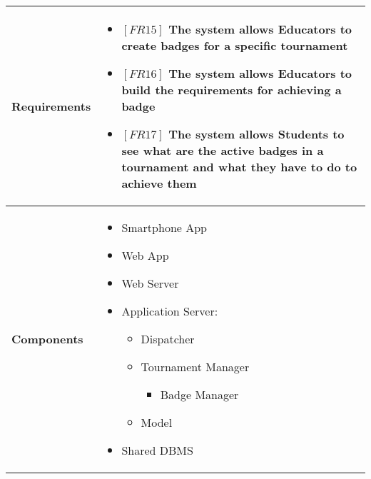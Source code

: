 \documentclass{article}
\begin{document}
\begin{table}[H]
 \renewcommand{\arraystretch}{1.5}
    \centering
    \begin{tabular}{|l|p{10cm}|}
        \hline
        \textbf{Requirements} &
        \vspace{-0.6cm}
        \begin{itemize}[label={}, left=0pt, align=left, itemsep=5pt]
            \item $[FR15]$ The system allows Educators to create badges for a specific tournament
            \item $[FR16]$ The system allows Educators to build the requirements for achieving a badge
            \item $[FR17]$ The system allows Students to see what are the active badges in a tournament and what they have to do to achieve them
        \end{itemize} \\
        \hline
        \textbf{Components} & 
        \begin{itemize}[align=left, topsep=0pt, partopsep=0pt]
            \item Smartphone App
            \item Web App
            \item Web Server
            \item Application Server:
            \begin{itemize}
                \item Dispatcher
                \item Tournament Manager
                \begin{itemize}
                    \item Badge Manager
                \end{itemize}
                \item Model
            \end{itemize}
            \item Shared DBMS 
        \end{itemize} \\
        \hline
    \end{tabular}
\end{table}
\end{document}
